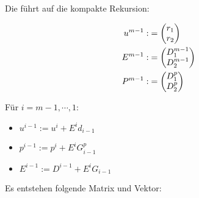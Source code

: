 Die führt auf die kompakte Rekursion:


\begin{align*}
u^{m-1} :&= \begin{pmatrix} r_1 \\ r_2 \end{pmatrix} \\
E^{m-1} :&= \begin{pmatrix} D_1^{m-1} \\ D_2^{m-1} \end{pmatrix} \\
P^{m-1} :&= \begin{pmatrix} D_1^p \\ D_2^p \end{pmatrix} \\
\end{align*}

Für $i=m-1,\cdots,1$:

\begin{itemize}
\item $u^{i-1} := u^i + E^i d_{i-1}$
\item $p^{i-1} := p^i + E^i G_{i-1}^p$
\item $E^{i-1} := D^{i-1} + E^i G_{i-1}$
\end{itemize}

Es entstehen folgende Matrix und Vektor:























